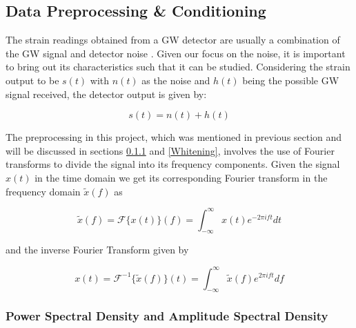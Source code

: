 \documentclass[12pt]{article}
\begin{document}
\pagebreak
\subsection{Data Preprocessing \& Conditioning}\label{DataConditioning}

\noindent The strain readings obtained from a GW detector are usually a combination of the GW signal and detector noise \cite{cutler_gravitational_1994, moore_gravitational-wave_2015, Li:2013lza}. Given our focus on the noise, it is important to bring out its characteristics such that it can be studied. Considering the strain output to be $s(t)$ with $n(t)$ as the noise and $h(t)$ being the possible GW signal received, the detector output is given by:

\begin{equation}
    s(t) = n(t) + h(t)
    \label{eq:strain_output}
\end{equation}

\medskip
\noindent The preprocessing in this project, which was mentioned in previous section and will be discussed in sections \ref{PSD_ASD} and \ref{Whitening}, involves the use of Fourier transforms to divide the signal into its frequency components. Given the signal $x(t)$ in the time domain we get its corresponding Fourier transform in the frequency domain $\tilde{x}(f)$ as

\begin{equation}
    \tilde{x}(f) = \mathcal{F}\{ x(t) \} (f) = \int_{-\infty}^{\infty} x(t) e^{-2 \pi i f t} dt
    \label{eq:fourier_transform}
\end{equation}

\medskip
\noindent and the inverse Fourier Transform given by

\begin{equation}
  x(t) = \mathcal{F}^{-1} \{ \tilde{x}(f) \} (t) = \int_{-\infty}^{\infty} \tilde{x}(f) e^{2 \pi i f t} df
  \label{eq:inverse_fourier_transform}
\end{equation}

\subsubsection{Power Spectral Density and Amplitude Spectral Density}\label{PSD_ASD}

\end{document}
